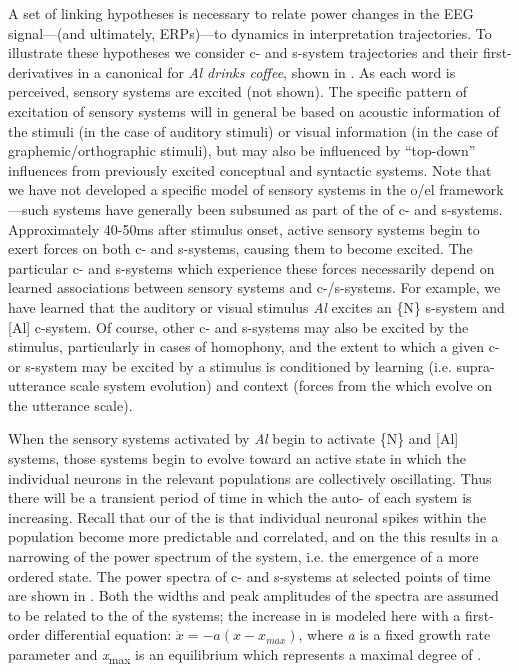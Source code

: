 A set of linking hypotheses is necessary to relate power changes in the EEG signal—(and ultimately, ERPs)—to  dynamics in interpretation trajectories. To illustrate these hypotheses we consider c- and s-system  trajectories and their first-derivatives in a canonical  for \textit{Al drinks coffee}, shown in {}. As each word is perceived, sensory systems are excited (not shown). The specific pattern of excitation of sensory systems will in general be based on acoustic information of the stimuli (in the case of auditory stimuli) or visual information (in the case of graphemic/orthographic stimuli), but may also be influenced by “top-down” influences from previously excited conceptual and syntactic systems. Note that we have not developed a specific model of sensory systems in the o/el framework—such systems have generally been subsumed as part of the  of c- and s-systems. Approximately 40-50ms after stimulus onset, active sensory systems begin to exert forces on both c- and s-systems, causing them to become excited. The particular c- and s-systems which experience these forces necessarily depend on learned associations between sensory systems and c-/s-systems. For example, we have learned that the auditory or visual stimulus \textit{Al} excites an \{N\} s-system and [Al] c-system. Of course, other c- and s-systems may also be excited by the stimulus, particularly in cases of homophony, and the extent to which a given c- or s-system may be excited by a stimulus is conditioned by learning (i.e. supra-utterance scale system evolution) and context (forces from the  which evolve on the utterance scale).

  When the sensory systems activated by \textit{Al} begin to activate \{N\} and [Al] systems, those systems begin to evolve toward an active state in which the individual neurons in the relevant populations are collectively oscillating. Thus there will be a transient period of time in which the auto- of each system is increasing. Recall that our  of the  is that individual neuronal spikes within the population become more predictable and correlated, and on the  this results in a narrowing of the power spectrum of the system, i.e. the emergence of a more ordered state. The power spectra of c- and s-systems at selected points of time are shown in {}. Both the widths and peak amplitudes of the spectra are assumed to be related to the  of the systems; the increase in  is modeled here with a first-order differential equation:  $\dot{{x}}=-a\left(x-{x}_{\mathit{max}}\right)$, where \textit{a} is a fixed growth rate parameter and \textit{x}\textsubscript{max} is an equilibrium which represents a maximal degree of . 

